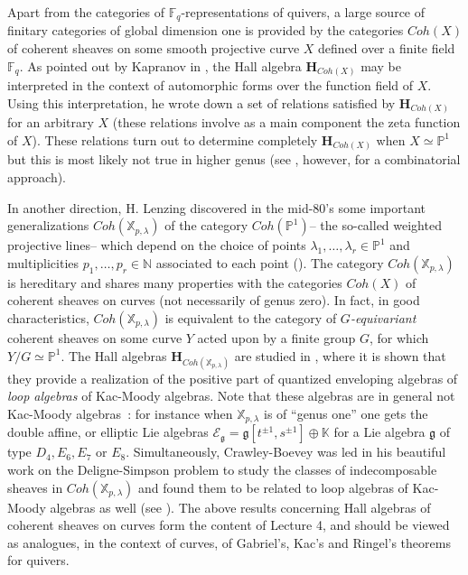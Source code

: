 \documentclass[a4paper,10pt]{amsart}
\def\H{\mathbf{H}}
\def\N{\mathbb{N}}
\def\g{\mathfrak{g}}
\numberwithin{equation}{section}
\begin{document}
\vspace{.1in}

Apart from the categories of $\mathbb{F}_q$-representations of quivers, a large source of finitary categories of global dimension one is provided by the categories $Coh(X)$ of coherent sheaves on some smooth projective curve $X$ defined over a finite field $\mathbb{F}_q$. As pointed out by Kapranov in \cite{Kap1},
the Hall algebra $\H_{Coh(X)}$ may be interpreted in the context of automorphic forms over the function field of $X$. Using this interpretation, he wrote down a set of relations satisfied by $\H_{Coh(X)}$ for an arbitrary $X$ (these relations involve as a main component the zeta function of $X$). These relations turn out to determine completely $\H_{Coh(X)}$ when $X \simeq \mathbb{P}^1$ but this is most likely not true in higher genus (see \cite{SV3}, however,  for a combinatorial approach).

\vspace{.1in}

In another direction, H. Lenzing discovered in the mid-80's some important generalizations $Coh(\mathbb{X}_{p,\lambda})$ of the category $Coh(\mathbb{P}^1)$-- the so-called weighted projective lines-- which depend on the choice of points $\lambda_1, \ldots, \lambda_r \in \mathbb{P}^1$ and multiplicities $p_1, \ldots, p_r \in \N$ associated to each point (\cite{Lenzing1}).
The category $Coh(\mathbb{X}_{p,\lambda})$ is hereditary and shares many properties with the categories $Coh(X)$ of coherent sheaves on curves (not necessarily of genus zero). In fact, in good characteristics, $Coh(\mathbb{X}_{p,\lambda})$ is equivalent to the category of \textit{$G$-equivariant} coherent sheaves on some curve $Y$ acted upon by a finite group $G$, for which $Y/G \simeq \mathbb{P}^1$. The Hall algebras $\H_{Coh(\mathbb{X}_{p,\lambda})}$ are studied in \cite{SDuke}, where it is shown that they provide a realization of the positive part of quantized enveloping algebras of \textit{loop algebras} of Kac-Moody algebras. Note that these algebras are in general not Kac-Moody algebras~: for instance when $\mathbb{X}_{p,\lambda}$ is of ``genus one'' one gets the double affine, or elliptic Lie algebras $\mathcal{E}_{\g}=\mathfrak{g}[t^{\pm 1}, s^{\pm 1}] \oplus \mathbb{K}$ for a Lie algebra $\mathfrak{g}$ of type $D_4, E_6, E_7$ or $E_8$. Simultaneously, Crawley-Boevey was led in his beautiful work on the Deligne-Simpson problem \cite{CBSimpson} to study the classes of indecomposable sheaves in $Coh(\mathbb{X}_{p,\lambda})$ and found them to be related to loop algebras of Kac-Moody algebras as well (see \cite{CB2}).
The above results concerning Hall algebras of coherent sheaves on curves form the content of Lecture 4, and should be viewed as analogues, in the context of curves, of Gabriel's, Kac's and Ringel's theorems for quivers.
\end{document}
